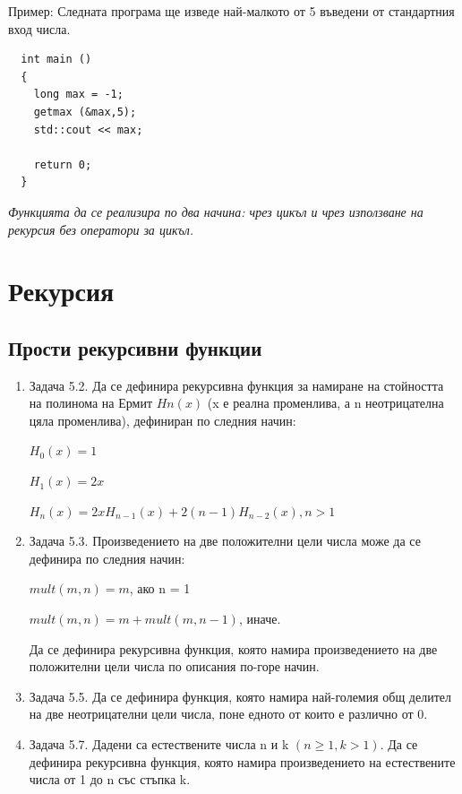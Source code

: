 \documentclass[12pt,a4paper]{article}
\begin{document}
{\begin{enumerate}[resume]
  Пример: Следната програма ще изведе най-малкото от 5 въведени от стандартния вход числа.
  \begin{verbatim}
  int main ()
  {
    long max = -1;
    getmax (&max,5);
    std::cout << max;

    return 0;
  }
  \end{verbatim}
  \emph{Функцията да се реализира по два начина: чрез цикъл и чрез използване на рекурсия без оператори за цикъл.}
\end{enumerate}

\pagebreak

\section {Рекурсия}
\subsection {Прости рекурсивни функции}

\begin{enumerate}

	\item Задача 5.2.\cite{sbornik} Да се дефинира рекурсивна функция за намиране на стойността на полинома на Ермит $Hn(x)$ (x е реална променлива, а n неотрицателна цяла променлива), дефиниран по следния начин:

	$H_0(x)=1$

	$H_1(x)=2x$

	$H_n(x)=2xH_{n-1}(x)+2(n-1)H_{n-2}(x), n>1$


	\item Задача 5.3.\cite{sbornik} Произведението на две положителни цели числа може да се дефинира по
следния начин:

	$mult (m,n) = m$, ако n = 1

	$mult (m,n) = m + mult (m,n-1)$, иначе.

	Да се дефинира рекурсивна функция, която намира произведението на две положителни цели числа по описания по-горе начин.

	\item Задача 5.5.\cite{sbornik} Да се дефинира функция, която намира най-големия общ делител на две неотрицателни цели числа, поне едното от които е различно от 0.

	\item Задача 5.7.\cite{sbornik} Дадени са естествените числа n и k $(n \ge 1, k > 1)$. Да се дефинира рекурсивна функция, която намира произведението на естествените числа от 1 до n със стъпка k.


\end{enumerate}}
\end{document}
